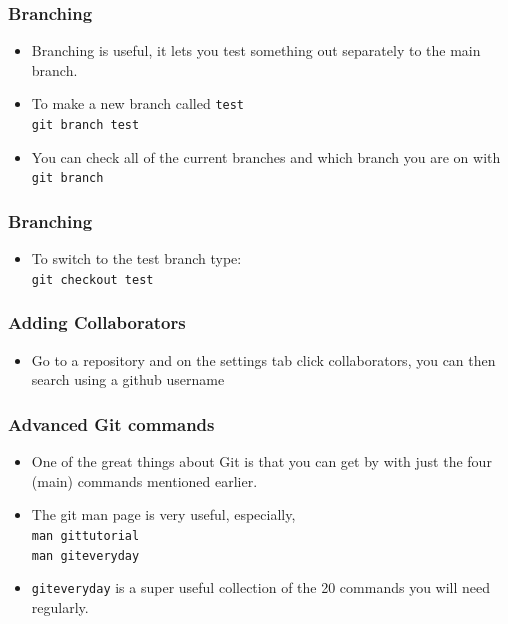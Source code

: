 \documentclass{beamer}
\begin{document}
\begin{frame}
\frametitle{Branching}
\begin{itemize}
\item Branching is useful, it lets you test something out separately to the main branch.
\item To make a new branch called \texttt{test} \\
\texttt{git branch test} 
\item You can check all of the current branches and which branch you are on with \\
	\texttt{git branch}
\end{itemize}
\end{frame}

\begin{frame}
\frametitle{Branching}
\begin{itemize}
	\item To switch to the test branch type: \\ 
	\texttt{git checkout test} \\
\end{itemize}
\end{frame}

\begin{frame}
\frametitle{Adding Collaborators}
\begin{itemize}
	\item Go to a repository and on the settings tab click collaborators, you can then search using a github username
\end{itemize}
\end{frame}

\begin{frame}
\frametitle{Advanced Git commands}
\begin{itemize}
    \item One of the great things about Git is that you can get by with just the four (main) commands mentioned earlier.
	\item The git man page is very useful, especially, \\
	\texttt{man gittutorial} \\
	\texttt{man giteveryday} \\ 
\item \texttt{giteveryday} is a super useful collection of the 20 commands you will need regularly.
\end{itemize}
\end{frame}
\end{document}
